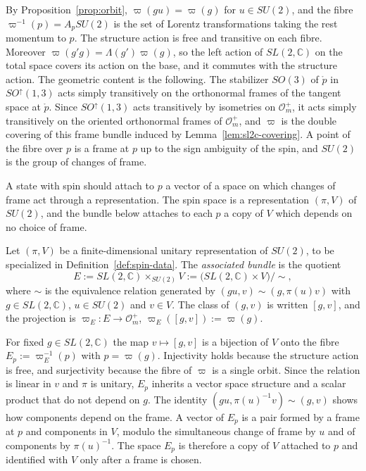 \begin{remark}
	By Proposition~\ref{prop:orbit}, $\varpi(gu)=\varpi(g)$ for $u\in SU(2)$, and the fibre $\varpi^{-1}(p)=A_pSU(2)$ is the set of Lorentz transformations taking the rest momentum to $p$. The structure action is free and transitive on each fibre. Moreover $\varpi(g'g)=\Lambda(g')\varpi(g)$, so the left action of $SL(2,\mathbb{C})$ on the total space covers its action on the base, and it commutes with the structure action. The geometric content is the following. The stabilizer $SO(3)$ of $\mathring{p}$ in $SO^\uparrow(1,3)$ acts simply transitively on the orthonormal frames of the tangent space at $\mathring{p}$. Since $SO^\uparrow(1,3)$ acts transitively by isometries on $\mathcal{O}_m^+$, it acts simply transitively on the oriented orthonormal frames of $\mathcal{O}_m^+$, and $\varpi$ is the double covering of this frame bundle induced by Lemma~\ref{lem:sl2c-covering}. A point of the fibre over $p$ is a frame at $p$ up to the sign ambiguity of the spin, and $SU(2)$ is the group of changes of frame.
\end{remark}

A state with spin should attach to $p$ a vector of a space on which changes of frame act through a representation. The spin space is a representation $(\pi,V)$ of $SU(2)$, and the bundle below attaches to each $p$ a copy of $V$ which depends on no choice of frame.

\begin{definition}\label{def:associated-bundle}
	Let $(\pi,V)$ be a finite-dimensional unitary representation of $SU(2)$, to be specialized in Definition~\ref{def:spin-data}. The \emph{associated bundle} is the quotient
	\begin{equation*}
		E:=SL(2,\mathbb{C})\times_{SU(2)}V:=\big(SL(2,\mathbb{C})\times V\big)/\!\sim,
	\end{equation*}
	where $\sim$ is the equivalence relation generated by $(gu,v)\sim(g,\pi(u)v)$ with $g\in SL(2,\mathbb{C})$, $u\in SU(2)$ and $v\in V$. The class of $(g,v)$ is written $[g,v]$, and the projection is $\varpi_E:E\to\mathcal{O}_m^+$, $\varpi_E([g,v]):=\varpi(g)$.
\end{definition}

\begin{remark}
	For fixed $g\in SL(2,\mathbb{C})$ the map $v\mapsto[g,v]$ is a bijection of $V$ onto the fibre $E_p:=\varpi_E^{-1}(p)$ with $p=\varpi(g)$. Injectivity holds because the structure action is free, and surjectivity because the fibre of $\varpi$ is a single orbit. Since the relation is linear in $v$ and $\pi$ is unitary, $E_p$ inherits a vector space structure and a scalar product that do not depend on $g$. The identity $(gu,\pi(u)^{-1}v)\sim(g,v)$ shows how components depend on the frame. A vector of $E_p$ is a pair formed by a frame at $p$ and components in $V$, modulo the simultaneous change of frame by $u$ and of components by $\pi(u)^{-1}$. The space $E_p$ is therefore a copy of $V$ attached to $p$ and identified with $V$ only after a frame is chosen.
\end{remark}

